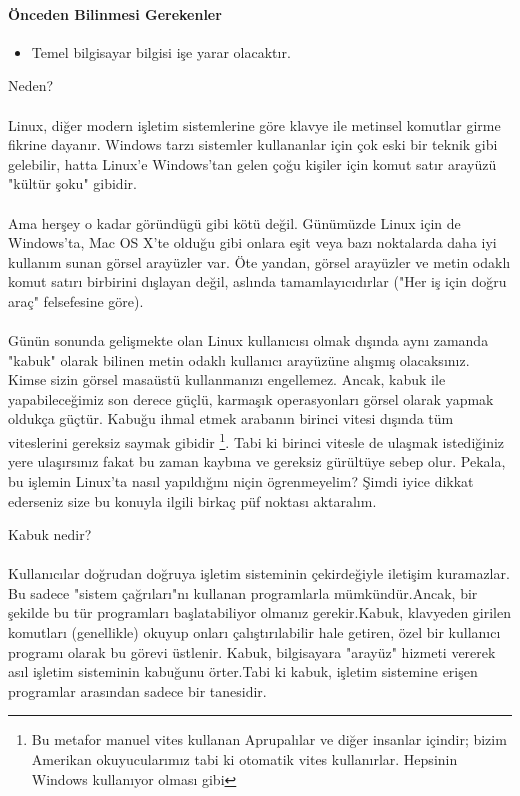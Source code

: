 \documentclass[10pt,a5paper]{book}
\begin{document}
\paragraph{Önceden Bilinmesi Gerekenler}
\begin{itemize}
 \item Temel bilgisayar bilgisi işe yarar olacaktır.
 \end{itemize}

\begin{section}{Neden?}
\paragraph{}{Linux, diğer modern işletim sistemlerine göre klavye ile metinsel komutlar girme fikrine dayanır. Windows tarzı sistemler kullananlar için çok eski bir teknik gibi gelebilir, hatta Linux'e Windows'tan gelen çoğu kişiler için komut satır arayüzü "kültür şoku" gibidir.}
\paragraph{}{Ama herşey o kadar göründügü gibi kötü değil. Günümüzde Linux için de Windows'ta, Mac OS X'te olduğu gibi onlara eşit veya bazı noktalarda daha iyi kullanım sunan görsel arayüzler var. Öte yandan, görsel arayüzler ve metin odaklı komut satırı birbirini dışlayan değil, aslında tamamlayıcıdırlar ("Her iş için doğru araç" felsefesine göre)}.
\paragraph{}{Günün sonunda gelişmekte olan Linux kullanıcısı olmak dışında aynı zamanda "kabuk" olarak bilinen metin odaklı kullanıcı arayüzüne alışmış olacaksınız. Kimse sizin görsel masaüstü kullanmanızı engellemez. Ancak, kabuk ile yapabileceğimiz son derece güçlü, karmaşık operasyonları görsel olarak yapmak oldukça güçtür. Kabuğu ihmal etmek arabanın birinci vitesi dışında tüm viteslerini gereksiz saymak gibidir
\footnote{Bu metafor manuel vites kullanan Aprupalılar ve diğer insanlar içindir; bizim Amerikan okuyucularımız tabi ki otomatik vites kullanırlar.
Hepsinin Windows kullanıyor olması gibi}. Tabi ki birinci vitesle de ulaşmak istediğiniz yere ulaşırsınız fakat bu zaman kaybına ve gereksiz gürültüye sebep olur. Pekala, bu işlemin Linux'ta nasıl yapıldığını niçin ögrenmeyelim? Şimdi iyice dikkat ederseniz size bu konuyla ilgili birkaç püf noktası aktaralım.}
\begin{subsection}{Kabuk nedir?}
\paragraph{}{Kullanıcılar doğrudan doğruya işletim sisteminin çekirdeğiyle iletişim kuramazlar. Bu sadece "sistem çağrıları"nı kullanan programlarla mümkündür.Ancak, bir şekilde bu tür programları başlatabiliyor olmanız gerekir.Kabuk, klavyeden girilen komutları (genellikle) okuyup onları çalıştırılabilir hale getiren, özel bir kullanıcı programı olarak bu görevi üstlenir. Kabuk, bilgisayara "arayüz" hizmeti vererek asıl işletim sisteminin kabuğunu örter.Tabi ki kabuk, işletim sistemine erişen programlar arasından sadece bir tanesidir.}

\end{subsection}
\end{section}
\end{document}
